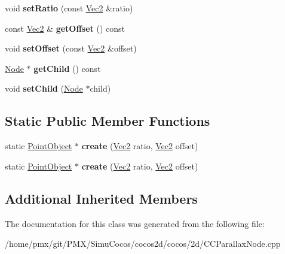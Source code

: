 \begin{DoxyCompactItemize}
\mbox{\label{classPointObject_a276c33781f5f91abfc4a6e215e76468e}} 
void {\bfseries set\+Ratio} (const \hyperlink{classVec2}{Vec2} \&ratio)
\item 
\mbox{\label{classPointObject_aa238ba69996046c02e9036e9c0d8b953}} 
const \hyperlink{classVec2}{Vec2} \& {\bfseries get\+Offset} () const
\item 
\mbox{\label{classPointObject_ac7d2002b8b601c72edb2b4bd4038315a}} 
void {\bfseries set\+Offset} (const \hyperlink{classVec2}{Vec2} \&offset)
\item 
\mbox{\label{classPointObject_a6b41da11fac5f69898b76571d8dd82eb}} 
\hyperlink{classNode}{Node} $\ast$ {\bfseries get\+Child} () const
\item 
\mbox{\label{classPointObject_a2de69ae66a1af86ee4c46a12e8b47386}} 
void {\bfseries set\+Child} (\hyperlink{classNode}{Node} $\ast$child)
\end{DoxyCompactItemize}
\subsection*{Static Public Member Functions}
\begin{DoxyCompactItemize}
\item 
\mbox{\label{classPointObject_ac6a8d5473a345db12afc61f4b6df1618}} 
static \hyperlink{classPointObject}{Point\+Object} $\ast$ {\bfseries create} (\hyperlink{classVec2}{Vec2} ratio, \hyperlink{classVec2}{Vec2} offset)
\item 
\mbox{\label{classPointObject_ac6a8d5473a345db12afc61f4b6df1618}} 
static \hyperlink{classPointObject}{Point\+Object} $\ast$ {\bfseries create} (\hyperlink{classVec2}{Vec2} ratio, \hyperlink{classVec2}{Vec2} offset)
\end{DoxyCompactItemize}
\subsection*{Additional Inherited Members}


The documentation for this class was generated from the following file\+:\begin{DoxyCompactItemize}
\item 
/home/pmx/git/\+P\+M\+X/\+Simu\+Cocos/cocos2d/cocos/2d/C\+C\+Parallax\+Node.\+cpp\end{DoxyCompactItemize}
